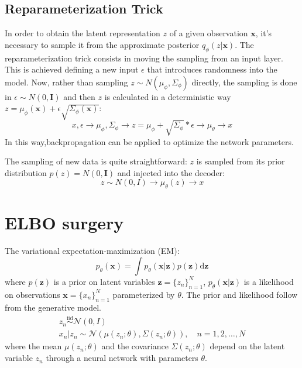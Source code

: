\documentclass[5p,sort&compress]{elsarticle}
\begin{document}
\subsection{Reparameterization Trick}

In order to obtain the latent representation $z$ of a given observation $\boldsymbol{x}$, it's necessary to sample it from the approximate posterior $q_{\phi}(z|\boldsymbol{x})$. The reparameterization trick consists in moving the sampling from an input layer. This is achieved defining a new input $\epsilon$ that introduces randomness into the model. Now, rather than sampling $z \sim N(\mu_{\phi}, \Sigma_{\phi})$ directly, the sampling is done in $\epsilon \sim N(0, \boldsymbol{I})$ and then $z$ is calculated in a deterministic way $z=\mu_{\phi}(\boldsymbol{x}) + \epsilon \sqrt{\Sigma_{\phi}(\boldsymbol{x})}$:
\begin{equation}
x, \epsilon \rightarrow \mu_{\phi}, \Sigma_{\phi} \rightarrow z=\mu_{\phi}+\sqrt{\Sigma_{\phi}} * \epsilon \rightarrow \mu_{\theta} \rightarrow x
\end{equation}
In this way,backpropagation can be applied to optimize the network parameters.

The sampling of new data is quite straightforward: $z$ is sampled from its prior distribution $p(z) = N(0, \boldsymbol{I})$ and injected into the decoder:
\begin{equation}
z \sim N(0, I) \rightarrow \mu_{\theta}(z) \rightarrow x
\end{equation}


\section{ELBO surgery}

The variational expectation-maximization (EM):
\begin{equation}
p_{\theta}(\boldsymbol{x})=\int p_{\theta}(\boldsymbol{x} | \boldsymbol{z}) p(\boldsymbol{z}) \mathrm{d} \boldsymbol{z}
\end{equation}
where $p(\boldsymbol{z})$ is a prior on latent variables $\boldsymbol{z}=\{z_n\}_{n=1}^N$, $p_{\theta}(\boldsymbol{x} | \boldsymbol{z})$ is a likelihood on observations $\boldsymbol{x}=\{x_n\}_{n=1}^N$ parameterized by $\theta$. The prior and likelihood follow from the generative model.
\begin{equation}
\begin{aligned}
z_{n} \stackrel{\mathrm{iid}}{\sim} \mathcal{N}(0, I) \\
x_{n} | z_{n} \sim \mathcal{N}\left(\mu\left(z_{n} ; \theta\right), \Sigma\left(z_{n} ; \theta\right)\right), \quad n=1,2, \ldots, N
\end{aligned}
\end{equation}
where the mean $\mu\left(z_{n} ; \theta\right)$ and the covariance $\Sigma\left(z_{n} ; \theta\right)$ depend on the latent variable $z_n$ through a neural network with parameters $\theta$.
\end{document}
